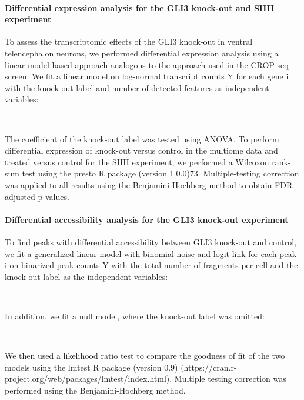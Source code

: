 \paragraph{Differential expression analysis for the GLI3 knock-out and SHH experiment}
To assess the transcriptomic effects of the GLI3 knock-out in ventral telencephalon neurons, we performed differential expression analysis using a linear model-based approach analogous to the approach used in the CROP-seq screen. We fit a linear model on log-normal transcript counts Y for each gene i with the knock-out label and number of detected features as independent variables:
 
            ~
 
The coefficient of the knock-out label was tested using ANOVA. To perform differential expression of knock-out versus control in the multiome data and treated versus control for the SHH experiment, we performed a Wilcoxon rank-sum test using the presto R package (version 1.0.0)73. Multiple-testing correction was applied to all results using the Benjamini-Hochberg method to obtain FDR-adjusted p-values.
 
 
\paragraph{Differential accessibility analysis for the GLI3 knock-out experiment}
To find peaks with differential accessibility between GLI3 knock-out and control, we fit a generalized linear model with binomial noise and logit link for each peak i on binarized peak counts Y with the total number of fragments per cell and the knock-out label as the independent variables:
 
            ~
 
In addition, we fit a null model, where the knock-out label was omitted:
 
            ~
 
We then used a likelihood ratio test to compare the goodness of fit of the two models using the lmtest R package (version 0.9) (https://cran.r-project.org/web/packages/lmtest/index.html). Multiple testing correction was performed using the Benjamini-Hochberg method.
 
